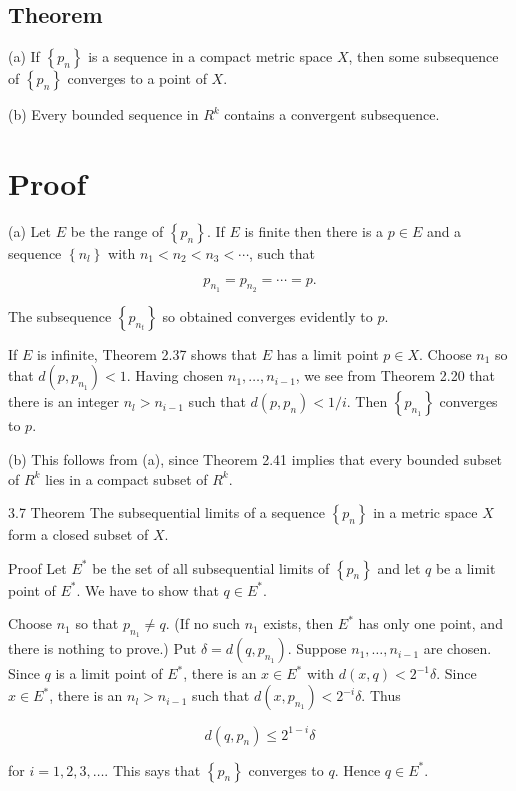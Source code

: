 \documentclass[10pt]{article}
\begin{document}
\subsection{Theorem}
(a) If $\left\{p_{n}\right\}$ is a sequence in a compact metric space $X$, then some subsequence of $\left\{p_{n}\right\}$ converges to a point of $X$.

(b) Every bounded sequence in $R^{k}$ contains a convergent subsequence.

\section{Proof}
(a) Let $E$ be the range of $\left\{p_{n}\right\}$. If $E$ is finite then there is a $p \in E$ and a sequence $\left\{n_{l}\right\}$ with $n_{1}<n_{2}<n_{3}<\cdots$, such that

$$
p_{n_{1}}=p_{n_{2}}=\cdots=p .
$$

The subsequence $\left\{p_{n_{t}}\right\}$ so obtained converges evidently to $p$.

If $E$ is infinite, Theorem 2.37 shows that $E$ has a limit point $p \in X$. Choose $n_{1}$ so that $d\left(p, p_{n_{1}}\right)<1$. Having chosen $n_{1}, \ldots, n_{i-1}$, we see from Theorem 2.20 that there is an integer $n_{l}>n_{i-1}$ such that $d\left(p, p_{n}\right)<1 / i$. Then $\left\{p_{n_{1}}\right\}$ converges to $p$.

(b) This follows from (a), since Theorem 2.41 implies that every bounded subset of $R^{k}$ lies in a compact subset of $R^{k}$.

3.7 Theorem The subsequential limits of a sequence $\left\{p_{n}\right\}$ in a metric space $X$ form a closed subset of $X$.

Proof Let $E^{*}$ be the set of all subsequential limits of $\left\{p_{n}\right\}$ and let $q$ be a limit point of $E^{*}$. We have to show that $q \in E^{*}$.

Choose $n_{1}$ so that $p_{n_{1}} \neq q$. (If no such $n_{1}$ exists, then $E^{*}$ has only one point, and there is nothing to prove.) Put $\delta=d\left(q, p_{n_{1}}\right)$. Suppose $n_{1}, \ldots, n_{i-1}$ are chosen. Since $q$ is a limit point of $E^{*}$, there is an $x \in E^{*}$ with $d(x, q)<2^{-1} \delta$. Since $x \in E^{*}$, there is an $n_{l}>n_{i-1}$ such that $d\left(x, p_{n_{1}}\right)<2^{-i} \delta$. Thus

$$
d\left(q, p_{n}\right) \leq 2^{1-i} \delta
$$

for $i=1,2,3, \ldots$. This says that $\left\{p_{n}\right\}$ converges to $q$. Hence $q \in E^{*}$.
\end{document}
